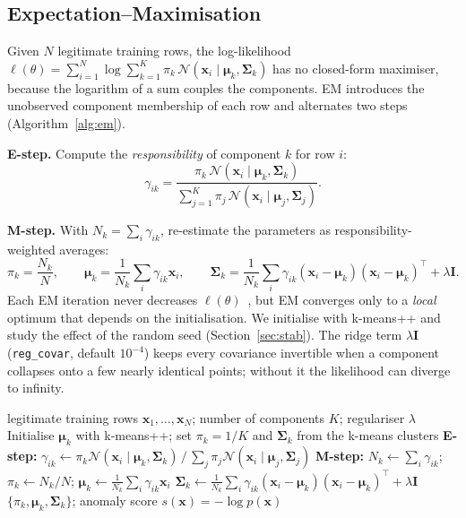 \documentclass[12pt]{article}
\begin{document}
\subsection{Expectation--Maximisation}
Given $N$ legitimate training rows, the log-likelihood
$\ell(\theta)=\sum_{i=1}^{N}\log\sum_{k=1}^{K}\pi_k\,\mathcal{N}(\mathbf{x}_i\mid\bm\mu_k,\bm\Sigma_k)$ has no closed-form
maximiser, because the logarithm of a sum couples the components. EM introduces the unobserved component membership
of each row and alternates two steps (Algorithm~\ref{alg:em}).

\textbf{E-step.} Compute the \emph{responsibility} of component $k$ for row $i$:
\begin{equation}
\gamma_{ik}=\frac{\pi_k\,\mathcal{N}(\mathbf{x}_i\mid\bm\mu_k,\bm\Sigma_k)}{\sum_{j=1}^{K}\pi_j\,\mathcal{N}(\mathbf{x}_i\mid\bm\mu_j,\bm\Sigma_j)}.
\end{equation}

\textbf{M-step.} With $N_k=\sum_i\gamma_{ik}$, re-estimate the parameters as responsibility-weighted averages:
\begin{equation}
\pi_k=\frac{N_k}{N},\qquad \bm\mu_k=\frac{1}{N_k}\sum_{i}\gamma_{ik}\mathbf{x}_i,\qquad
\bm\Sigma_k=\frac{1}{N_k}\sum_{i}\gamma_{ik}(\mathbf{x}_i-\bm\mu_k)(\mathbf{x}_i-\bm\mu_k)^{\top}+\lambda\mathbf{I}.
\end{equation}
Each EM iteration never decreases $\ell(\theta)$~\cite{dempster1977}, but EM converges only to a \emph{local} optimum
that depends on the initialisation. We initialise with k-means++ and study the effect of the random seed
(Section~\ref{sec:stab}). The ridge term $\lambda\mathbf{I}$ (\texttt{reg\_covar}, default $10^{-4}$) keeps every
covariance invertible when a component collapses onto a few nearly identical points; without it the likelihood can
diverge to infinity.

\begin{algorithm}[H]
\caption{EM for a Gaussian mixture fitted on legitimate transactions}
\label{alg:em}
\begin{algorithmic}[1]
\Require legitimate training rows $\mathbf{x}_1,\dots,\mathbf{x}_N$; number of components $K$; regulariser $\lambda$
\State Initialise $\bm\mu_k$ with k-means++; set $\pi_k=1/K$ and $\bm\Sigma_k$ from the k-means clusters
\Repeat
  \State \textbf{E-step:} $\gamma_{ik}\gets \pi_k\mathcal{N}(\mathbf{x}_i\mid\bm\mu_k,\bm\Sigma_k)\,/\,\sum_j\pi_j\mathcal{N}(\mathbf{x}_i\mid\bm\mu_j,\bm\Sigma_j)$
  \State \textbf{M-step:} $N_k\gets\sum_i\gamma_{ik}$;\; $\pi_k\gets N_k/N$;\; $\bm\mu_k\gets\frac{1}{N_k}\sum_i\gamma_{ik}\mathbf{x}_i$
  \State {} $\bm\Sigma_k\gets\frac{1}{N_k}\sum_i\gamma_{ik}(\mathbf{x}_i-\bm\mu_k)(\mathbf{x}_i-\bm\mu_k)^{\top}+\lambda\mathbf{I}$
\State \Return $\{\pi_k,\bm\mu_k,\bm\Sigma_k\}$; anomaly score $s(\mathbf{x})=-\log p(\mathbf{x})$
\end{algorithmic}
\end{algorithm}
\end{document}
